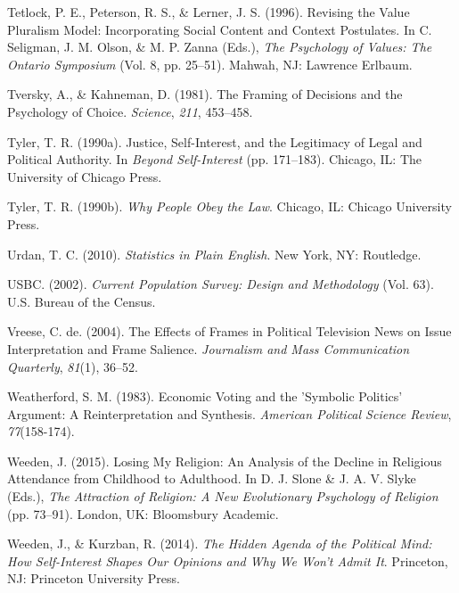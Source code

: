 \documentclass[12pt,econ]{sources/authesis}
\begin{document}
\leavevmode\hypertarget{ref-tetlock_1996_revising}{}%
Tetlock, P. E., Peterson, R. S., \& Lerner, J. S. (1996). Revising the Value Pluralism Model: Incorporating Social Content and Context Postulates. In C. Seligman, J. M. Olson, \& M. P. Zanna (Eds.), \emph{The Psychology of Values: The Ontario Symposium} (Vol. 8, pp. 25--51). Mahwah, NJ: Lawrence Erlbaum.

\leavevmode\hypertarget{ref-tversky_framing_1981}{}%
Tversky, A., \& Kahneman, D. (1981). The Framing of Decisions and the Psychology of Choice. \emph{Science}, \emph{211}, 453--458.

\leavevmode\hypertarget{ref-tyler_justice_1990}{}%
Tyler, T. R. (1990a). Justice, Self-Interest, and the Legitimacy of Legal and Political Authority. In \emph{Beyond Self-Interest} (pp. 171--183). Chicago, IL: The University of Chicago Press.

\leavevmode\hypertarget{ref-tyler_1990_people}{}%
Tyler, T. R. (1990b). \emph{Why People Obey the Law}. Chicago, IL: Chicago University Press.

\leavevmode\hypertarget{ref-urdan_statistics_2010}{}%
Urdan, T. C. (2010). \emph{Statistics in Plain English}. New York, NY: Routledge.

\leavevmode\hypertarget{ref-census_2002_current}{}%
USBC. (2002). \emph{Current Population Survey: Design and Methodology} (Vol. 63). U.S. Bureau of the Census.

\leavevmode\hypertarget{ref-vreese_effects_2004}{}%
Vreese, C. de. (2004). The Effects of Frames in Political Television News on Issue Interpretation and Frame Salience. \emph{Journalism and Mass Communication Quarterly}, \emph{81}(1), 36--52.

\leavevmode\hypertarget{ref-weatherford_economic_1983}{}%
Weatherford, S. M. (1983). Economic Voting and the 'Symbolic Politics' Argument: A Reinterpretation and Synthesis. \emph{American Political Science Review}, \emph{77}(158-174).

\leavevmode\hypertarget{ref-weeden_2015_losing}{}%
Weeden, J. (2015). Losing My Religion: An Analysis of the Decline in Religious Attendance from Childhood to Adulthood. In D. J. Slone \& J. A. V. Slyke (Eds.), \emph{The Attraction of Religion: A New Evolutionary Psychology of Religion} (pp. 73--91). London, UK: Bloomsbury Academic.

\leavevmode\hypertarget{ref-weeden_2014_hidden}{}%
Weeden, J., \& Kurzban, R. (2014). \emph{The Hidden Agenda of the Political Mind: How Self-Interest Shapes Our Opinions and Why We Won't Admit It}. Princeton, NJ: Princeton University Press.
\end{document}
